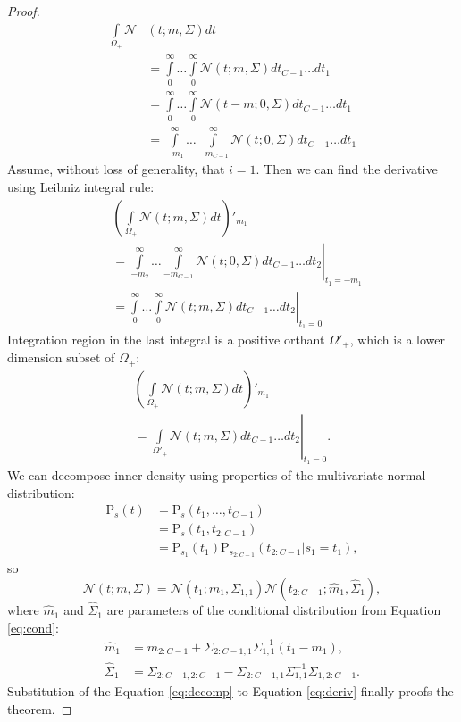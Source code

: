 \documentclass[nohyperref]{article}
\theoremstyle{plain}
\theoremstyle{definition}
\theoremstyle{remark}
\begin{document}
\begin{proof}
\begin{align}
    \int\limits_{\Omega_+}\mathcal{N}&(t; m, \Sigma) dt \\
    &= \int\limits_0^\infty \dots \int\limits_0^\infty \mathcal{N}(t; m, \Sigma) dt_{C-1} \dots dt_1 \\
    &= \int\limits_0^\infty \dots \int\limits_0^\infty \mathcal{N}(t - m; 0, \Sigma) dt_{C-1} \dots dt_1 \\
    &= \int\limits_{-m_1}^\infty \dots \int\limits_{-m_{C-1}}^\infty \mathcal{N}(t; 0, \Sigma) dt_{C-1} \dots dt_1
\end{align}
Assume, without loss of generality, that $i = 1$. Then we can find the derivative using Leibniz integral rule:
\begin{align}
    &\left(\int\limits_{\Omega_+}\mathcal{N}(t; m, \Sigma) dt\right)'_{m_1} \\
    &= \left.\int\limits_{-m_2}^\infty \dots \int\limits_{-m_{C-1}}^\infty \mathcal{N}(t; 0, \Sigma) dt_{C-1} \dots dt_2 \right\vert_{t_1 = -m_1} \\
    &= \left.\int\limits_0^\infty \dots \int\limits_0^\infty \mathcal{N}(t; m, \Sigma) dt_{C-1} \dots dt_2 \right\vert_{t_1 = 0}
\end{align}
Integration region in the last integral is a positive orthant $\Omega'_+$, which is a lower dimension subset of $\Omega_+$:
\begin{multline}
    \left(\int\limits_{\Omega_+}\mathcal{N}(t; m, \Sigma) dt\right)'_{m_1} \\
    = \left.\int\limits_{\Omega'_+} \mathcal{N}(t; m, \Sigma) dt_{C-1} \dots dt_2 \right\vert_{t_1 = 0}.
    \label{eq:deriv}
\end{multline}
We can decompose inner density using properties of the multivariate normal distribution:
\begin{align}
    \mathrm{P}_s(t) &= \mathrm{P}_s(t_1, \dots, t_{C-1}) \\
    &= \mathrm{P}_s(t_1, t_{2:C-1}) \\
    &= \mathrm{P}_{s_1}(t_1) \mathrm{P}_{s_{2:C-1}}(t_{2:C-1} | s_1 = t_1),
    \label{eq:cond}
\end{align}
so
\begin{equation}
    \mathcal{N}(t; m, \Sigma) = \mathcal{N}(t_1;m_1, \Sigma_{1, 1})
    \mathcal{N}(t_{2:C-1}; \hat m_1, \hat \Sigma_1),
    \label{eq:decomp}
\end{equation}
where $\hat m_1$ and $\hat \Sigma_1$ are parameters of the conditional distribution from Equation \ref{eq:cond}:
\begin{align}
    \hat m_1 &= m_{2:C-1} + \Sigma_{2:C-1,1}\Sigma^{-1}_{1,1}(t_1 - m_1), \\
    \hat \Sigma_1 &= \Sigma_{2:C-1,2:C-1} - \Sigma_{2:C-1,1}\Sigma^{-1}_{1,1}\Sigma_{1,2:C-1}.
\end{align}
Substitution of the Equation \ref{eq:decomp} to Equation \ref{eq:deriv} finally proofs the theorem.
\end{proof}
\end{document}

